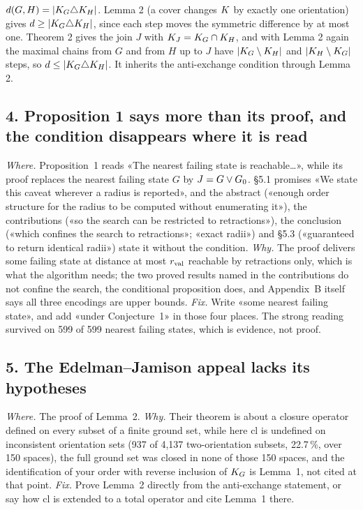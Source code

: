 %
{$d(G, H) = |K_G \triangle K_H|$. Lemma 2 (a cover changes $K$ by exactly one orientation)
gives $d \ge |K_G \triangle K_H|$, since each step moves the symmetric difference by at most
one. Theorem 2 gives the join $J$ with $K_J = K_G \cap K_H$, and with Lemma 2 again the
maximal chains from $G$ and from $H$ up to $J$ have $|K_G \setminus K_H|$ and
$|K_H \setminus K_G|$ steps, so $d \le |K_G \triangle K_H|$. It inherits the
anti-exchange condition through Lemma 2.}

\subsection*{4. Proposition 1 says more than its proof, and the condition disappears where it is read}

\emph{Where.} Proposition~1 reads «The nearest failing state is reachable\dots», while its proof
replaces the nearest failing state $G$ by $J = G \vee G_0$. \S5.1 promises «We state this caveat
wherever a radius is reported», and the abstract («enough order structure for the radius to be computed
without enumerating it»), the contributions («so the search can be restricted to retractions»), the
conclusion («which confines the search to retractions»; «exact radii») and \S5.3 («guaranteed to return
identical radii») state it without the condition. \emph{Why.} The proof delivers some failing state at
distance at most $r_{\mathrm{val}}$ reachable by retractions only, which is what the algorithm needs; the two proved results
named in the contributions do not confine the search, the conditional proposition does, and Appendix~B
itself says all three encodings are upper bounds. \emph{Fix.} Write «some nearest failing state», and
add «under Conjecture~1» in those four places. The strong reading survived on 599 of 599 nearest
failing states, which is evidence, not proof.

\subsection*{5. The Edelman--Jamison appeal lacks its hypotheses}

\emph{Where.} The proof of Lemma~2. \emph{Why.} Their theorem is about a closure operator defined on
every subset of a finite ground set, while here $\mathrm{cl}$ is undefined on inconsistent orientation
sets (937 of 4,137 two-orientation subsets, 22.7\,\%, over 150 spaces), the full ground set was closed in
none of those 150 spaces, and the identification of your order with reverse inclusion of $K_G$ is
Lemma~1, not cited at that point. \emph{Fix.} Prove Lemma~2 directly from the anti-exchange statement, or
say how $\mathrm{cl}$ is extended to a total operator and cite Lemma~1 there.

